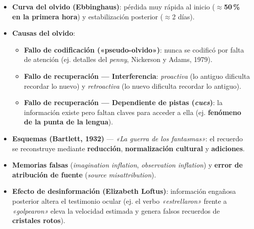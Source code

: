 \documentclass[11pt,a4paper]{article}
\begin{document}
\begin{itemize}
  \item \textbf{Curva del olvido (Ebbinghaus)}: pérdida muy rápida al inicio (\textbf{$\approx$50\,\% en la primera hora}) y estabilización posterior ($\approx$2 días).
  \item \textbf{Causas del olvido}:
  \begin{itemize}
    \item \textbf{Fallo de codificación («pseudo-olvido»)}: nunca se codificó por falta de atención (ej. detalles del \textit{penny}, Nickerson y Adams, 1979).
    \item \textbf{Fallo de recuperación — Interferencia}: \textit{proactiva} (lo antiguo dificulta recordar lo nuevo) y \textit{retroactiva} (lo nuevo dificulta recordar lo antiguo).
    \item \textbf{Fallo de recuperación — Dependiente de pistas (\textit{cues})}: la información existe pero faltan claves para acceder a ella (ej. \textbf{fenómeno de la punta de la lengua}).
  \end{itemize}
\end{itemize}

\begin{cajaIdea}[title={Naturaleza reconstructiva y distorsiones de la memoria}]
\begin{itemize}
  \item \textbf{Esquemas (Bartlett, 1932)} — \textit{«La guerra de los fantasmas»}: el recuerdo se reconstruye mediante \textbf{reducción}, \textbf{normalización cultural} y \textbf{adiciones}.
  \item \textbf{Memorias falsas} (\textit{imagination inflation}, \textit{observation inflation}) y \textbf{error de atribución de fuente} (\textit{source misattribution}).
  \item \textbf{Efecto de desinformación (Elizabeth Loftus)}: información engañosa posterior altera el testimonio ocular (ej. el verbo \textit{«estrellaron»} frente a \textit{«golpearon»} eleva la velocidad estimada y genera falsos recuerdos de \textbf{cristales rotos}).
\end{itemize}
\end{cajaIdea}
\end{document}
